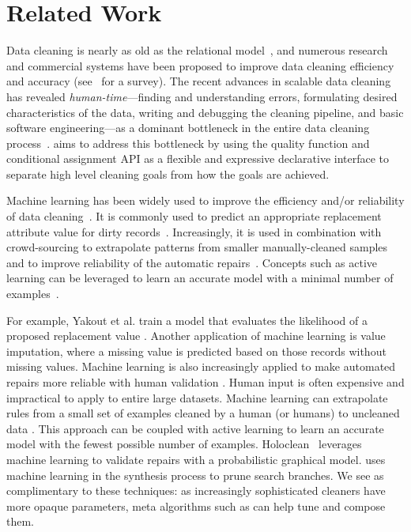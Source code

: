 \section{Related Work}
Data cleaning is nearly as old as the relational model~\cite{codd1970relational}, and numerous research and  commercial systems have been proposed to improve data cleaning efficiency and accuracy (see~\cite{rahm2000data} for a survey).
The recent advances in scalable data cleaning~\cite{wang1999sample, DBLP:journals/debu/KrishnanWFGKM015, khayyat2015bigdansing, altowim2014progressive, he2016interactive, rekatsinas2017holoclean} has revealed {\it human-time}---finding and understanding errors, formulating desired characteristics of the data, writing and debugging the cleaning pipeline, and basic software engineering---as a dominant bottleneck in the entire data cleaning process~\cite{krishnan2016hilda}.  
\sys aims to address this bottleneck by using the quality function and conditional assignment API as a flexible and expressive declarative interface to separate high level cleaning goals from how the goals are achieved.  

 Machine learning has been widely used to improve the efficiency and/or reliability of data cleaning~\cite{DBLP:journals/pvldb/YakoutENOI11,yakout2013don,gokhale2014corleone}.
It is commonly used to predict an appropriate replacement attribute value for dirty records~\cite{yakout2013don}.
Increasingly, it is used in combination with crowd-sourcing to extrapolate patterns from smaller manually-cleaned samples~\cite{gokhale2014corleone,DBLP:journals/pvldb/YakoutENOI11} and to improve reliability of the automatic repairs~\cite{DBLP:journals/pvldb/YakoutENOI11}.
Concepts such as active learning can be leveraged to learn an accurate model with a minimal number of examples~\cite{DBLP:journals/pvldb/MozafariSFJM14}.

For example, Yakout et al. train a model that evaluates the likelihood of a proposed replacement value \cite{yakout2013don}.
Another application of machine learning is value imputation, where a missing value is predicted based on those records without missing values.
Machine learning is also increasingly applied to make automated repairs more reliable with human validation \cite{DBLP:journals/pvldb/YakoutENOI11}.
 Human input is often expensive and impractical to apply to entire large datasets.
Machine learning can extrapolate rules from a small set of examples cleaned by a human (or humans) to uncleaned data \cite{gokhale2014corleone, DBLP:journals/pvldb/YakoutENOI11}.
This approach can be coupled with active learning \cite{DBLP:journals/pvldb/MozafariSFJM14} to learn an accurate model with the fewest possible number of examples.
Holoclean~\cite{rekatsinas2017holoclean} leverages machine learning to validate repairs with a probabilistic graphical model.
 \sys uses machine learning in the synthesis process to prune search branches.
 We see \sys as complimentary to these techniques: as increasingly sophisticated cleaners have more opaque parameters, meta algorithms such as \sys can help tune and compose them.


